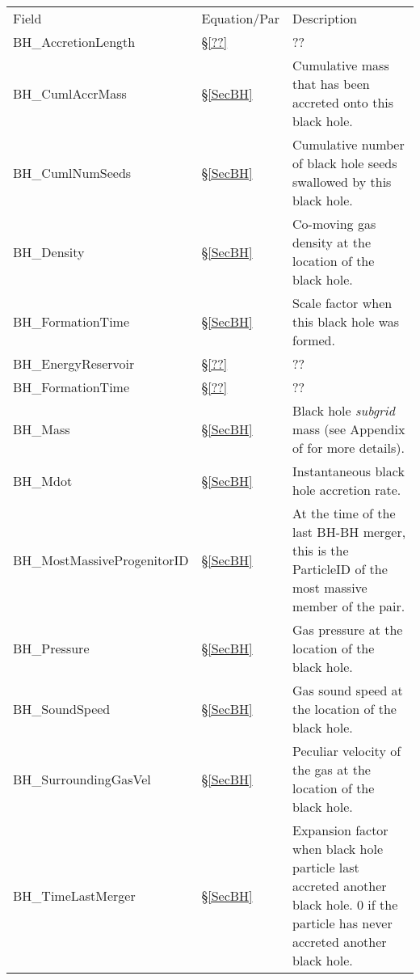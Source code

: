 \begin{tabular}{>{\ttfamily}p{4cm}p{1.5cm}p{11cm}}
\multicolumn{3}{l}{\large \bf PartType5: Black Holes} \\
\hline
Field & Equation/Par & Description \\ \hline\hline

BH\_AccretionLength &
\S\ref{??} &
?? \\

BH\_CumlAccrMass &
\S\ref{SecBH} &
Cumulative mass that has been accreted onto this black hole.  \\

BH\_CumlNumSeeds &
\S\ref{SecBH} &
Cumulative number of black hole seeds swallowed by this black hole. \\

BH\_Density &
\S\ref{SecBH} &
Co-moving gas density at the location of the black hole. \\

BH\_FormationTime &
\S\ref{SecBH} &
Scale factor when this black hole was formed. \\

BH\_EnergyReservoir &
\S\ref{??} &
?? \\

BH\_FormationTime &
\S\ref{??} &
?? \\

BH\_Mass &
\S\ref{SecBH} &
Black hole \textit{subgrid} mass (see Appendix of \cite{2016AnC....15...72M} for more details). \\

BH\_Mdot &
\S\ref{SecBH} &
Instantaneous black hole accretion rate. \\

BH\_MostMassiveProgenitorID &
\S\ref{SecBH} &
At the time of the last BH-BH merger, this is the ParticleID of the most massive member of the pair. \\

BH\_Pressure &
\S\ref{SecBH} &
Gas pressure at the location of the black hole. \\

BH\_SoundSpeed &
\S\ref{SecBH} &
Gas sound speed at the location of the black hole. \\

BH\_SurroundingGasVel &
\S\ref{SecBH} &
Peculiar velocity of the gas at the location of the black hole. \\

BH\_TimeLastMerger  &
\S\ref{SecBH} &
Expansion factor when black hole particle last accreted another black hole. 0 if the particle has never accreted another black hole. \\


\end{tabular}
